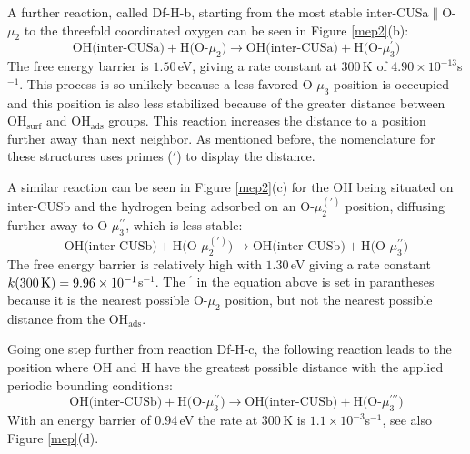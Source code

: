 \documentclass[11pt,DIV=13,BCOR=5mm,a4paper,headinclude]{scrbook}
\begin{document}
A further reaction, called Df-H-b, starting from the most stable inter-CUSa$\parallel$O-$\mu_2$ to the threefold coordinated oxygen can be seen in Figure \ref{mep2}(b):
\begin{equation}
 \text{OH(inter-CUSa)} + \text{H(O-$\mu_2$)} \rightarrow \text{OH(inter-CUSa)} + \text{H(O-$\mu_3^\prime$)} \tag{Df-H-b}
     \label{diffHb}
\end{equation}
The free energy barrier is $1.50\,$eV, giving a rate constant at $300\,$K of $4.90\times 10^{-13}$s$^{-1}$.
This process is so unlikely because a less favored O-$\mu_3$ position is occcupied and this position is also less stabilized because of the greater distance between OH$_{\text{surf}}$ and OH$_{\text{ads}}$ groups.
This reaction increases the distance to a position further away than next neighbor.
As mentioned before, the nomenclature for these structures uses primes ($\prime$) to display the distance.


A similar reaction can be seen in Figure \ref{mep2}(c) for the OH being situated on inter-CUSb and the hydrogen being adsorbed on an O-$\mu_2^{(\prime)}$ position, diffusing further away to O-$\mu_3^{\prime\prime}$, which is less stable:
\begin{equation}
 \text{OH(inter-CUSb)} + \text{H(O-$\mu_2^{(\prime)}$)} \rightarrow \text{OH(inter-CUSb)} + \text{H(O-$\mu_3^{\prime\prime}$)} \tag{Df-H-c}
     \label{diffHc}
\end{equation}
The free energy barrier is relatively high with $1.30\,$eV giving a rate constant $k(\textrm{300\,K})=9.96\times 10^{-1}$s$^{-1}$.
The $^\prime$ in the equation above is set in parantheses because it is the nearest possible O-$\mu_2$ position, but not the nearest possible distance from the OH$_\textrm{ads}$.

Going one step further from reaction Df-H-c, the following reaction leads to the position where OH and H have the greatest possible distance with the applied periodic bounding conditions:
\begin{equation}
 \text{OH(inter-CUSb)} + \text{H(O-$\mu_3^{\prime\prime}$)} \rightarrow \text{OH(inter-CUSb)} + \text{H(O-$\mu_3^{\prime\prime\prime}$)} \tag{Df-H-d}
     \label{diffHd}
\end{equation}
With an energy barrier of $0.94\,$eV the rate at $300\,$K is $1.1\times 10^{-3}$s$^{-1}$, see also Figure \ref{mep}(d).
\end{document}
